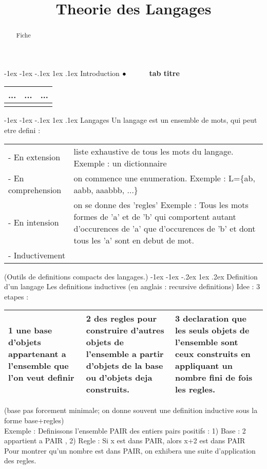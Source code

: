 \documentclass[5pt]{article}
\makeatletter
\newcommand\tab[1][1cm]{\hspace*{#1}}
\renewcommand{\subsubsection}{\@startsection {section}{1}{\z@}%
             {-1ex \@plus -1ex \@minus -.2ex}%
             {1ex \@plus.2ex}%
             {\normalfont\scriptsize\sffamily\bfseries}}
\renewcommand{\subsection}{\@startsection {section}{1}{\z@}%
             {-1ex \@plus -1ex \@minus -.1ex}%
             {1ex \@plus.1ex}%
             {\normalfont\small\sffamily\bfseries}}
\makeatother
\begin{document}
\begin{scriptsize}
\title{Theorie des Langages}
\date{}
\begin{abstract}
Fiche
\end{abstract}
\subsection{Introduction}
$\bullet\tab$
\textbf{tab titre}  \\
\noindent
\begin{tabularx}{\linewidth}{Y|Y|Y|}
\hline
... & ... & ...\\ \hline
\\ \hline
\end{tabularx} 
\subsection{Langages}
Un langage est un ensemble de mots, qui peut etre defini :\\
\begin{tabularx}{\linewidth}{|>{\setlength\hsize{0.3\hsize}}Y|>{\setlength\hsize{1.7\hsize}}Y|}
\hline
{}\\ \hline
- En extension & liste exhaustive de tous les mots du langage. Exemple : un dictionnaire\\\hline
- En comprehension & on commence une enumeration. Exemple : L=\{ab, aabb, aaabbb, ...\}\\\hline
- En intension & on se donne des 'regles' Exemple : Tous les mots formes de 'a' et de 'b' qui comportent autant d'occurences de 'a' que d'occurences de 'b' et dont tous les 'a' sont en debut de mot.\\\hline
- Inductivement&\\\hline
\end{tabularx} 
(Outils de definitions compacts des langages.)
\subsubsection{Definition d'un langage}
Les definitions inductives (en anglais : recursive definitions) Idee : 3 etapes : \\
\begin{tabularx}{\linewidth}{|Y|Y|Y|}
 une base d’objets appartenant a l’ensemble que l'on veut definir&
2 des regles pour construire d'autres objets de l'ensemble a partir d'objets de la base ou d'objets deja construits.&
3 declaration que les seuls objets de l’ensemble sont ceux construits en appliquant un nombre fini de fois les regles.\\\hline
\end{tabularx} 
(base pas forcement minimale;
on donne souvent une definition inductive sous la forme base+regles)\\
Exemple : Definissons l'ensemble PAIR des entiers pairs positifs :
1) Base : 2 appartient a PAIR ,
2) Regle : Si x est dans PAIR, alors x+2 est dans PAIR\\
Pour montrer qu’un nombre est dans PAIR, on exhibera une suite d'application des regles.

\end{scriptsize}
\end{document}
